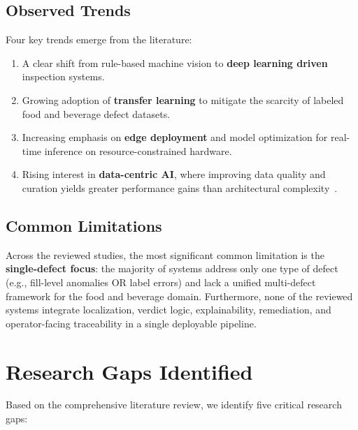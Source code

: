 \documentclass{ieeeaccess}
\begin{document}
\subsection{Observed Trends}
Four key trends emerge from the literature:
\begin{enumerate}
    \item A clear shift from rule-based machine vision to \textbf{deep learning driven} inspection systems.
    \item Growing adoption of \textbf{transfer learning} to mitigate the scarcity of labeled food and beverage defect datasets.
    \item Increasing emphasis on \textbf{edge deployment} and model optimization for real-time inference on resource-constrained hardware.
    \item Rising interest in \textbf{data-centric AI}, where improving data quality and curation yields greater performance gains than architectural complexity~\cite{cvpackaging2024}.
\end{enumerate}

\subsection{Common Limitations}
Across the reviewed studies, the most significant common limitation is the \textbf{single-defect focus}: the majority of systems address only one type of defect (e.g., fill-level anomalies OR label errors) and lack a unified multi-defect framework for the food and beverage domain. Furthermore, none of the reviewed systems integrate localization, verdict logic, explainability, remediation, and operator-facing traceability in a single deployable pipeline.


\section{Research Gaps Identified}
\label{sec:gaps}
Based on the comprehensive literature review, we identify five critical research gaps:
\end{document}
